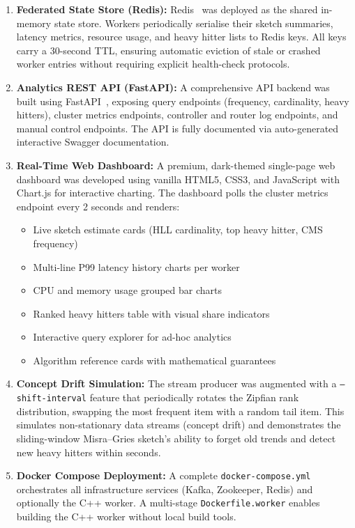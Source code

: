 \begin{enumerate}
 \item \textbf{Federated State Store (Redis):}
 Redis~\cite{redis} was deployed as the shared in-memory state store. Workers periodically serialise their sketch summaries, latency metrics, resource usage, and heavy hitter lists to Redis keys. All keys carry a 30-second TTL, ensuring automatic eviction of stale or crashed worker entries without requiring explicit health-check protocols.

 \item \textbf{Analytics REST API (FastAPI):}
 A comprehensive API backend was built using FastAPI~\cite{fastapi}, exposing query endpoints (frequency, cardinality, heavy hitters), cluster metrics endpoints, controller and router log endpoints, and manual control endpoints. The API is fully documented via auto-generated interactive Swagger documentation.

 \item \textbf{Real-Time Web Dashboard:}
 A premium, dark-themed single-page web dashboard was developed using vanilla HTML5, CSS3, and JavaScript with Chart.js for interactive charting. The dashboard polls the cluster metrics endpoint every 2 seconds and renders:
 \begin{itemize}
 \item Live sketch estimate cards (HLL cardinality, top heavy hitter, CMS frequency)
 \item Multi-line P99 latency history charts per worker
 \item CPU and memory usage grouped bar charts
 \item Ranked heavy hitters table with visual share indicators
 \item Interactive query explorer for ad-hoc analytics
 \item Algorithm reference cards with mathematical guarantees
 \end{itemize}

 \item \textbf{Concept Drift Simulation:}
 The stream producer was augmented with a \texttt{--shift-interval} feature that periodically rotates the Zipfian rank distribution, swapping the most frequent item with a random tail item. This simulates non-stationary data streams (concept drift) and demonstrates the sliding-window Misra--Gries sketch's ability to forget old trends and detect new heavy hitters within seconds.

 \item \textbf{Docker Compose Deployment:}
 A complete \texttt{docker-compose.yml} orchestrates all infrastructure services (Kafka, Zookeeper, Redis) and optionally the C++ worker. A multi-stage \texttt{Dockerfile.worker} enables building the C++ worker without local build tools.
\end{enumerate}

